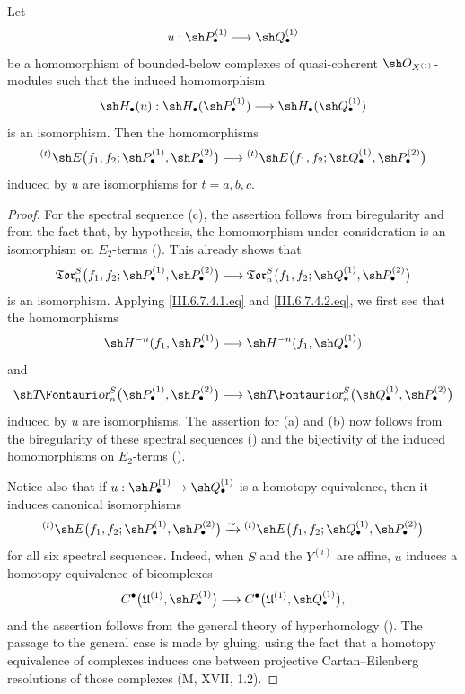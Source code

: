 \begin{proposition}[6.7.5]
\label{III.6.7.5}
Let
\[
  u:\sh P_\bullet^{(1)}
  \longrightarrow
  \sh Q_\bullet^{(1)}
\]
be a homomorphism of bounded-below complexes of quasi-coherent
$\sh O_{X^{(1)}}$-modules such that the induced homomorphism
\[
  \sh H_\bullet(u):
  \sh H_\bullet(\sh P_\bullet^{(1)})
  \longrightarrow
  \sh H_\bullet(\sh Q_\bullet^{(1)})
\]
is an isomorphism.  Then the homomorphisms
\[
  {}^{(t)}\sh E
  \bigl(
    f_1,f_2;
    \sh P_\bullet^{(1)},\sh P_\bullet^{(2)}
  \bigr)
  \longrightarrow
  {}^{(t)}\sh E
  \bigl(
    f_1,f_2;
    \sh Q_\bullet^{(1)},\sh P_\bullet^{(2)}
  \bigr)
\]
induced by $u$ are isomorphisms for $t=a,b,c$.
\end{proposition}

\begin{proof}
For the spectral sequence \textnormal{(c)}, the assertion follows
from biregularity and from the fact that, by hypothesis, the
homomorphism under consideration is an isomorphism on
$E_2$-terms ().  This already shows that
\[
\begin{split}
  \mathfrak{Tor}_n^S
  \bigl(
    f_1,f_2;
    \sh P_\bullet^{(1)},\sh P_\bullet^{(2)}
  \bigr)
  \longrightarrow
  \mathfrak{Tor}_n^S
  \bigl(
    f_1,f_2;
    \sh Q_\bullet^{(1)},\sh P_\bullet^{(2)}
  \bigr)
\end{split}
\]
is an isomorphism.  Applying \eqref{III.6.7.4.1.eq} and
\eqref{III.6.7.4.2.eq}, we first see that the homomorphisms
\[
  \sh H^{-n}(f_1,\sh P_\bullet^{(1)})
  \longrightarrow
  \sh H^{-n}(f_1,\sh Q_\bullet^{(1)})
\]
and
\[
  \shTor_n^S
  \bigl(
    \sh P_\bullet^{(1)},\sh P_\bullet^{(2)}
  \bigr)
  \longrightarrow
  \shTor_n^S
  \bigl(
    \sh Q_\bullet^{(1)},\sh P_\bullet^{(2)}
  \bigr)
\]
induced by $u$ are isomorphisms.  The assertion for
\textnormal{(a)} and \textnormal{(b)} now follows from the
biregularity of these spectral sequences
() and the bijectivity of the induced
homomorphisms on $E_2$-terms ().

Notice also that if
$u:\sh P_\bullet^{(1)}\to\sh Q_\bullet^{(1)}$ is a homotopy
equivalence, then it induces canonical isomorphisms
\[
  {}^{(t)}\sh E
  \bigl(
    f_1,f_2;
    \sh P_\bullet^{(1)},\sh P_\bullet^{(2)}
  \bigr)
  \xrightarrow{\sim}
  {}^{(t)}\sh E
  \bigl(
    f_1,f_2;
    \sh Q_\bullet^{(1)},\sh P_\bullet^{(2)}
  \bigr)
\]
for all six spectral sequences.  Indeed, when $S$ and the
$Y^{(i)}$ are affine, $u$ induces a homotopy equivalence of
bicomplexes
\[
  C^\bullet
  \bigl(
    \mathfrak U^{(1)},\sh P_\bullet^{(1)}
  \bigr)
  \longrightarrow
  C^\bullet
  \bigl(
    \mathfrak U^{(1)},\sh Q_\bullet^{(1)}
  \bigr),
\]
and the assertion follows from the general theory of
hyperhomology ().  The passage to the general
case is made by gluing, using the fact that a homotopy
equivalence of complexes induces one between projective
Cartan--Eilenberg resolutions of those complexes
(\textnormal{M}, XVII, 1.2).
\end{proof}

